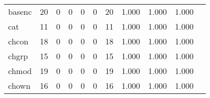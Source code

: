 \begin{longtable}{lp{1.2cm}p{1.2cm}p{1.2cm}p{1.2cm}p{1.2cm}p{1.2cm}p{1.2cm}p{1.2cm}p{1.2cm}p{1.2cm}}
basenc    &                                    20 &                                                  0 &                                                  0 &                                                  0 &                                                  0 &                                                 20 &                                              1.000 &                                              1.000 &                                              1.000 \\
cat       &                                    11 &                                                  0 &                                                  0 &                                                  0 &                                                  0 &                                                 11 &                                              1.000 &                                              1.000 &                                              1.000 \\
chcon     &                                    18 &                                                  0 &                                                  0 &                                                  0 &                                                  0 &                                                 18 &                                              1.000 &                                              1.000 &                                              1.000 \\
chgrp     &                                    15 &                                                  0 &                                                  0 &                                                  0 &                                                  0 &                                                 15 &                                              1.000 &                                              1.000 &                                              1.000 \\
chmod     &                                    19 &                                                  0 &                                                  0 &                                                  0 &                                                  0 &                                                 19 &                                              1.000 &                                              1.000 &                                              1.000 \\
chown     &                                    16 &                                                  0 &                                                  0 &                                                  0 &                                                  0 &                                                 16 &                                              1.000 &                                              1.000 &                                              1.000 \\

\end{longtable}
